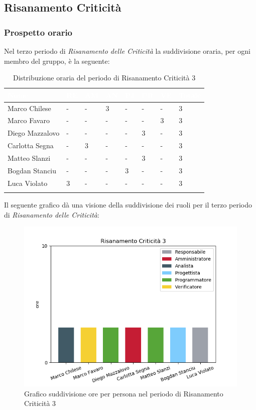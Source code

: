 \newpage
\subsection{Risanamento Criticità}
\label{PRC3}

\subsubsection{Prospetto orario}
Nel terzo periodo di \textit{Risanamento delle Criticità} la suddivisione oraria, per ogni membro del gruppo, è la seguente:

\begin{longtable}{|C{.30\textwidth}|C{.06\textwidth}|C{.06\textwidth}|C{.06\textwidth} | C{.06\textwidth}| C{.06\textwidth} | C{.06\textwidth} | C{.10\textwidth} |}
\hline
{}	\textbf{\textcolor{white}{Nome}} & \textbf{\textcolor{white}{RE}} & \textbf{\textcolor{white}{AM}} & \textbf{\textcolor{white}{AN}} & \textbf{\textcolor{white}{PJ}} & \textbf{\textcolor{white}{PR}} & \textbf{\textcolor{white}{VE}} & \textbf{\textcolor{white}{Totale}}\\
\hline 
	Marco Chilese & - & - & 3 & - & - & - & 3 \\
	\hline
	Marco Favaro & - & - & - & - & - & 3 & 3 \\
	\hline
	Diego Mazzalovo & - & - & - & - & 3 & - & 3 \\
	\hline
	Carlotta Segna & - & 3 & - & - & - & - & 3 \\
	\hline
	Matteo Slanzi & - & - & - & - & 3 & - & 3 \\
	\hline
	Bogdan Stanciu & - & - & - & 3 & - & - & 3 \\
	\hline
	Luca Violato & 3 & - & - & - & - & - & 3 \\   
	\hline
	
	
	\caption{Distribuzione oraria del periodo di Risanamento Criticità 3}
	\label{Distribuzione oraria rc3}
\end{longtable}

Il seguente grafico dà una visione della suddivisione dei ruoli per il terzo periodo di  \textit{Risanamento delle Criticità}:\begin{figure}[H]
	\centering
	\includegraphics[width=0.8\linewidth]{./images/fig_rc3.png}
	\caption{Grafico suddivisione ore per persona nel periodo di Risanamento Criticità 3}
	\label{fig:grafico ore suddivione ruoli rc3}
\end{figure}

